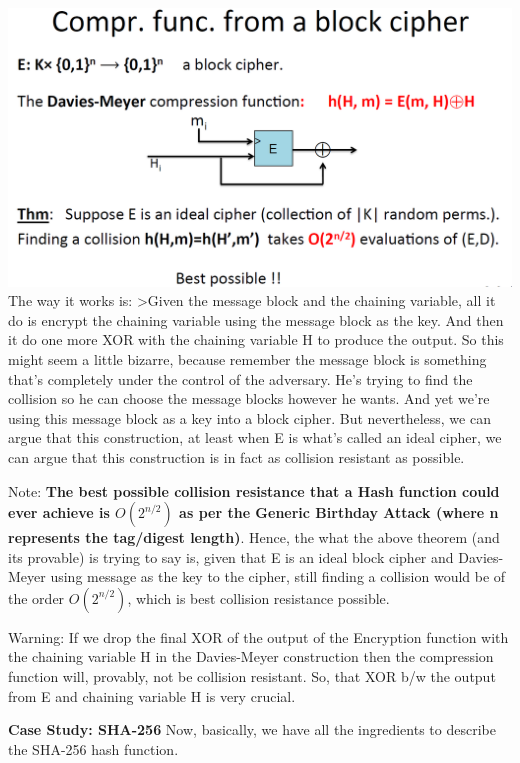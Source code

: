 \documentclass[11pt]{article}
\makeatletter
\def\maxwidth{\ifdim\Gin@nat@width>\linewidth\linewidth
    \else\Gin@nat@width\fi}
\let\Oldincludegraphics\includegraphics
\renewcommand{\includegraphics}[1]{\Oldincludegraphics[width=.8\maxwidth]{#1}}
\makeatother
\begin{document}
\includegraphics{./Images/Davies-Meyer.png} The way it works is:
\textgreater{}Given the message block and the chaining variable, all it
do is encrypt the chaining variable using the message block as the key.
And then it do one more XOR with the chaining variable H to produce the
output. So this might seem a little bizarre, because remember the
message block is something that's completely under the control of the
adversary. He's trying to find the collision so he can choose the
message blocks however he wants. And yet we're using this message block
as a key into a block cipher. But nevertheless, we can argue that this
construction, at least when E is what's called an ideal cipher, we can
argue that this construction is in fact as collision resistant as
possible.

Note: \textbf{The best possible collision resistance that a Hash
function could ever achieve is \(O(2^{n/2})\) as per the Generic
Birthday Attack (where n represents the tag/digest length)}. Hence, the
what the above theorem (and its provable) is trying to say is, given
that E is an ideal block cipher and Davies-Meyer using message as the
key to the cipher, still finding a collision would be of the order
\(O(2^{n/2})\), which is best collision resistance possible.

Warning: If we drop the final XOR of the output of the Encryption
function with the chaining variable H in the Davies-Meyer construction
then the compression function will, provably, not be collision
resistant. So, that XOR b/w the output from E and chaining variable H is
very crucial.

\textbf{Case Study: SHA-256} Now, basically, we have all the ingredients
to describe the SHA-256 hash function.
\end{document}
